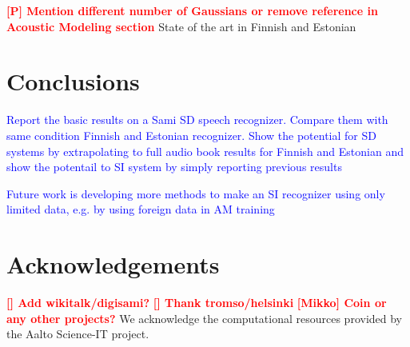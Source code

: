 \documentclass[b5paper]{article}
\newcommand{\todo}[2]{{\textcolor{red}{\bf [#1] #2 }}}
\newcommand{\note}[1]{{\textcolor{blue}{#1}}}
\begin{document}
\todo{P}{Mention different number of Gaussians or remove reference in Acoustic Modeling section}
State of the art in Finnish \cite{hirsimaki2006unlimited} and Estonian \cite{kurimo2015modeling}


\section{Conclusions} 
\note{Report the basic results on a Sami SD speech recognizer. Compare them with same condition Finnish and Estonian recognizer. Show the potential for SD systems by extrapolating to full audio book results for Finnish and Estonian and show the potentail to SI system by simply reporting previous results}

\note{Future work is developing more methods to make an SI recognizer using only limited data, e.g. by using foreign data in AM training}

\section{Acknowledgements} 
\todo{}{Add wikitalk/digisami?} \todo{}{Thank tromso/helsinki} \todo{Mikko}{Coin or any other projects?}
We acknowledge the computational resources provided by the Aalto Science-IT project.




 
\end{document}
